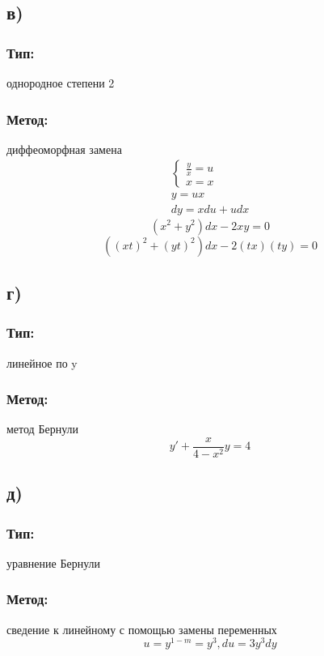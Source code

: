 \documentclass{article}
\begin{document}
\subsection*{в)}
\subsubsection*{Тип:} 
однородное степени 2

\subsubsection*{Метод:}
диффеоморфная замена
\begin{gather*}
\begin{cases}
\frac{y}{x}=u \\
x=x
\end{cases}\\
y=ux \\
dy=xdu+udx  
\end{gather*}
\begin{equation*}
(x^2+ y^2)dx - 2xy = 0
\end{equation*}
\begin{equation*}
((xt)^2+ (yt)^2)dx - 2(tx)(ty) = 0
\end{equation*}

\subsection*{г)}
\subsubsection*{Тип:} 
линейное по y

\subsubsection*{Метод:}
метод Бернули
\begin{equation*}
y' + \frac{x}{4 - x^2}y = 4
\end{equation*}

\subsection*{д)}
\subsubsection*{Тип:} 
уравнение Бернули

\subsubsection*{Метод:}
сведение к линейному с помощью замены переменных
\begin{equation*}
    u = y^{1-m}= y^3, du = 3y^3dy
\end{equation*}
\end{document}

